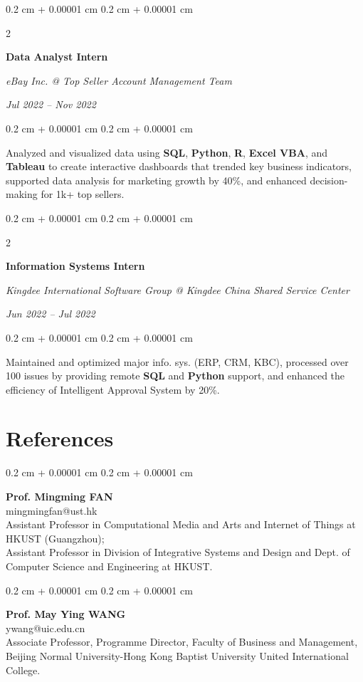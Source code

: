 \documentclass[10pt, letterpaper]{article}
\newenvironment{highlights}{
    \begin{itemize}[
        topsep=0.10 cm,
        parsep=0.10 cm,
        partopsep=0pt,
        itemsep=0pt,
        leftmargin=0.4 cm + 10pt
    ]
}{
    \end{itemize}
} %
\newenvironment{onecolentry}{
    \begin{adjustwidth}{
        0.2 cm + 0.00001 cm
    }{
        0.2 cm + 0.00001 cm
    }
}{
    \end{adjustwidth}
} %
\newenvironment{twocolentry}[2][]{
    \onecolentry
    \def\secondColumn{#2}
    \setcolumnwidth{\fill, 4.5 cm}
    \begin{paracol}{2}
}{
    \switchcolumn \raggedleft \secondColumn
    \end{paracol}
    \endonecolentry
} %
\begin{document}
        \begin{twocolentry}{
        \textit{Jul 2022 – Nov 2022}}
            \textbf{Data Analyst Intern}

            \textit{eBay Inc. @ Top Seller Account Management Team}
        \end{twocolentry}
        \begin{onecolentry}
            \begin{highlights}
                Analyzed and visualized data using \textbf{SQL}, \textbf{Python}, \textbf{R}, \textbf{Excel VBA}, and \textbf{Tableau} to create interactive dashboards that trended key business indicators, supported data analysis for marketing growth by 40\%, and enhanced decision-making for 1k+ top sellers.
            \end{highlights}
        \end{onecolentry}

        \vspace{0.2 cm}

        \begin{twocolentry}{
        \textit{Jun 2022 – Jul 2022}}
            \textbf{Information Systems Intern}

            \textit{Kingdee International Software Group @ Kingdee China Shared Service Center}
        \end{twocolentry}
        \begin{onecolentry}
            \begin{highlights}
                Maintained and optimized major info. sys. (ERP, CRM, KBC), processed over 100 issues by providing remote \textbf{SQL} and \textbf{Python} support, and enhanced the efficiency of Intelligent Approval System by 20\%.
            \end{highlights}
        \end{onecolentry}

    \section{References}

        \begin{onecolentry}
            \textbf{Prof. Mingming FAN} \\
            mingmingfan@ust.hk \\
            Assistant Professor in Computational Media and Arts and Internet of Things at HKUST (Guangzhou); \\
            Assistant Professor in Division of Integrative Systems and Design and Dept. of Computer Science and Engineering at HKUST.
        \end{onecolentry}

        \vspace{0.2 cm}

        \begin{onecolentry}
            \textbf{Prof. May Ying WANG} \\
            ywang@uic.edu.cn \\
            Associate Professor, Programme Director, Faculty of Business and Management, Beijing Normal University-Hong Kong Baptist University United International College.
        \end{onecolentry}
\end{document}
